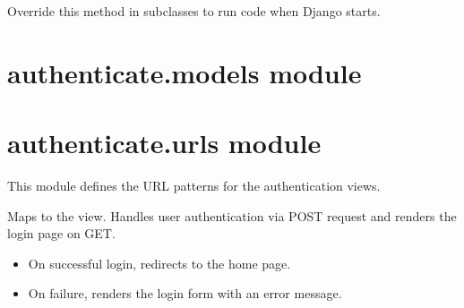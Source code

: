 \documentclass[letterpaper,10pt,english]{sphinxmanual}
\begin{document}
\begin{fulllineitems}

\begin{fulllineitems}
\label{\detokenize{authenticate:authenticate.apps.AuthenticateConfig.ready}}
\pysigstartsignatures
{}
\pysigstopsignatures
\sphinxAtStartPar
Override this method in subclasses to run code when Django starts.

\end{fulllineitems}


\end{fulllineitems}



\section{authenticate.models module}
\label{\detokenize{authenticate:module-authenticate.models}}\label{\detokenize{authenticate:authenticate-models-module}}

\section{authenticate.urls module}
\label{\detokenize{authenticate:authenticate-urls-module}}
\sphinxAtStartPar
This module defines the URL patterns for the authentication views.


\begin{fulllineitems}
\label{\detokenize{authenticate:get--login}}
\pysigstartsignatures
{}
\pysigstopsignatures
\sphinxAtStartPar
Maps to the  view. Handles user authentication via POST request and renders the login page on GET.
\begin{description}
\begin{itemize}
\item {} 
\sphinxAtStartPar
On successful login, redirects to the home page.

\item {} 
\sphinxAtStartPar
On failure, renders the login form with an error message.

\end{itemize}

\end{description}

\end{fulllineitems}
\end{document}
